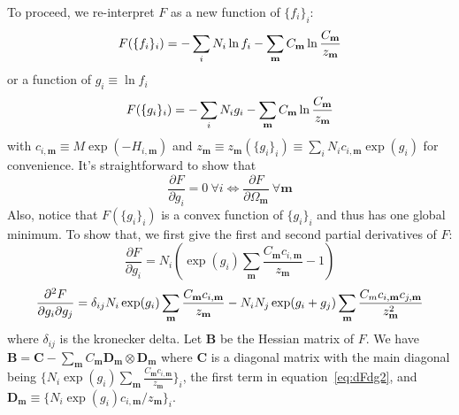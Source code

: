 To proceed, we re-interpret $F$ as a new function of $\{f_{i}\}_{i}$:
\begin{equation}
F(\{f_{i}\}_{i}) = - \sum_{i}^{} N_i \ln f_{i} \\ 
-\sum_{\mathbf{m}}^{} C_{\mathbf{m}} \ln \frac{C_{\mathbf{m}}}{z_{\mathbf{m}}} 
\label{eq:Fexf}
\end{equation}
or a function of $g_{i} \equiv \ln f_{i}$
\begin{equation}
F(\{g_{i}\}_{i}) = - \sum_{i}^{} N_i g_{i} \\ 
-\sum_{\mathbf{m}}^{} C_{\mathbf{m}} \ln \frac{C_{\mathbf{m}}}{z_{\mathbf{m}}} 
\label{eq:Fexg}
\end{equation}
with $c_{i,\mathbf{m}} \equiv M \exp(-H_{i,\mathbf{m}})$ and 
$z_{\mathbf{m}} \equiv z_{\mathbf{m}}(\{g_{i}\}_{i}) \equiv \sum\limits_{i}^{} N_{i} c_{i,\mathbf{m}} \exp(g_{i})$ 
for convenience. It's straightforward to show that
\begin{equation}
\frac{\partial F}{\partial g_{i}} = 0 \: \forall i \Leftrightarrow \frac{\partial F}{\partial \Omega_{\mathbf{m}}} \: \forall \mathbf{m}
\label{eq:Fequiv}
\end{equation}
Also, notice that $F(\{g_{i}\}_{i})$ is a convex function of $\{g_{i}\}_{i}$ and thus has one 
global minimum. To show that, we first give the first and second partial derivatives of $F$:
\begin{equation}
\frac{\partial F}{\partial g_{i}}  = N_{i} (\exp(g_{i}) \sum_{\mathbf{m}}^{} \frac{C_{\mathbf{m}} c_{i,\mathbf{m}} }{z_{\mathbf{m}}} -1)
\label{eq:dFdg}
\end{equation}
\begin{equation}
\frac{\partial^2 F }{\partial g_{i} \partial g_{j}} =  \\
\delta_{ij} N_{i} \exp(g_{i}) \sum_{\mathbf{m}}^{} \frac{C_{\mathbf{m}} c_{i,\mathbf{m}}}{z_{\mathbf{m}}} - \\
N_{i} N_{j} \exp(g_{i}+g_{j}) \sum_{\mathbf{m}}^{} \frac{C_{m}c_{i,\mathbf{m}}c_{j,\mathbf{m}}}{z_{\mathbf{m}}^2}
\label{eq:dFdg2}
\end{equation}
where $\delta_{ij}$ is the kronecker delta. Let $\mathbf{B}$ be the Hessian matrix of $F$. We 
have $\mathbf{B} = \mathbf{C} - \sum\limits_{\mathbf{m}}^{} C_{\mathbf{m}} \mathbf{D}_{\mathbf{m}} \otimes \mathbf{D}_{\mathbf{m}}$ 
where $\mathbf{C}$ is a diagonal matrix with the main diagonal being 
$\{N_{i} \exp(g_{i}) \sum\limits_{\mathbf{m}}^{} \frac{C_{\mathbf{m}} c_{i,\mathbf{m}}}{z_{\mathbf{m}}}\}_{i}$, 
the first term in equation~\ref{eq:dFdg2}, and $\mathbf{D}_{\mathbf{m}} \equiv \{N_{i} \exp(g_{i}) c_{i,\mathbf{m}}/z_{\mathbf{m}}\}_{i}$.
